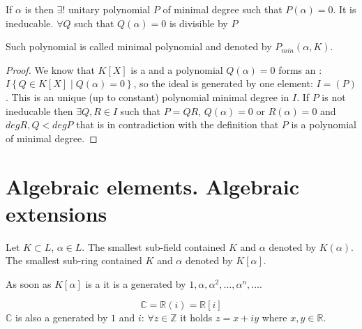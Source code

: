 \begin{lemma}
  If $\alpha$ is  then
  $\exists!$ unitary polynomial $P$ of minimal degree such that
  $P\left(\alpha\right) = 0$. It is ineducable. $\forall Q$ such that
  $Q\left(\alpha\right) = 0$ is divisible by $P$
  \begin{definition}
    Such polynomial is called minimal polynomial and denoted by
    $P_{min}\left(\alpha, K\right)$.
    \label{def:minpolynomial}
  \end{definition}
  \begin{proof}
    We know that $K\left[X\right]$ is a  and a
    polynomial $Q\left(\alpha\right) = 0$ forms an
    : $I \left\{Q \in K\left[X\right] \mid
    Q\left(\alpha\right) = 0 \right\}$, so the ideal is generated by
    one element: $I = \left(P\right)$. This is an unique (up to
    constant) polynomial minimal degree in $I$.
    If $P$ is not ineducable then $\exists Q,R \in I$ such that $P = Q
    R$, $Q(\alpha) = 0$ or $R(\alpha) = 0$ and
    $deg R,Q < deg P$ that is in contradiction with the definition
    that $P$ is a polynomial of minimal degree.
  \end{proof}
\end{lemma}

\section{Algebraic elements. Algebraic extensions}

\begin{definition}
  Let $K \subset L$, $\alpha \in L$. The smallest sub-field contained
  $K$ and $\alpha$ denoted by $K\left(\alpha\right)$. The smallest
  sub-ring contained $K$ and $\alpha$ denoted by $K\left[\alpha\right]$.
\end{definition}

As soon as $K\left[\alpha\right]$ is a  it is a
 generated by $1, \alpha, \alpha^2, \dots,
\alpha^n, \dots$.

\begin{example}[$\mathbb{C}$]
  \[
  \mathbb{C} = \mathbb{R}\left(i\right) = \mathbb{R}\left[i\right]
  \]
  $\mathbb{C}$ is also a  generated by $1$
  and $i$: $\forall z \in \mathbb{Z}$ it holds $z = x + i y$ where
  $x,y \in \mathbb{R}$.
\end{example}

